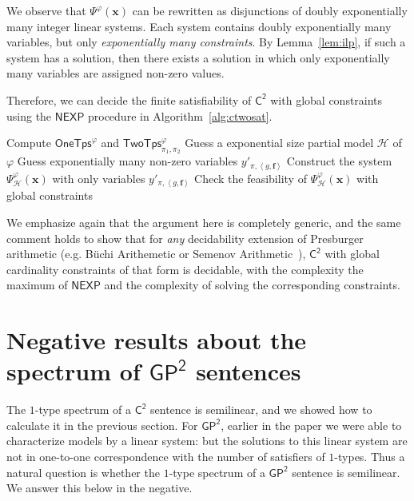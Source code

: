 \documentclass[10pt,a4paper]{article}
\theoremstyle{definition}
\theoremstyle{remark}
\newcommand{\cH}{\mathcal{H}}
\newcommand{\bff}{\mathbf{f}}
\newcommand{\bfx}{\mathbf{x}}
\newcommand{\nexp}  {\mathsf{NEXP}}
\newcommand{\nexptime}  {\mathsf{NEXP}}
\newcommand{\Ctwo}    {\mathsf{C^2}}
\newcommand{\twotypes}{\mathsf{TwoTps}}
\newcommand{\Onetypes}{\mathsf{OneTps}}
\newcommand{\GPtwo}   {\mathsf{GP^2}}
\newcommand{\tuple}[1]       {\left\langle #1 \right\rangle}
\begin{document}
We observe that $\Psi^\varphi(\bfx)$ can be rewritten as disjunctions of doubly exponentially many integer linear systems.
Each system contains doubly exponentially many variables, but only \emph{exponentially many constraints}.
By Lemma~\ref{lem:ilp}, if such a system has a solution,
then there exists a solution in which only exponentially many variables are assigned non-zero values.

Therefore, we can decide the finite satisfiability of $\Ctwo$ with global constraints 
using the $\nexp$ procedure in Algorithm~\ref{alg:ctwosat}.

\begin{algorithm}
\begin{algorithmic}[1]
\caption{Algorithm for the finite satisfiability problem of $\Ctwo$ with global constraints}\label{alg:ctwosat}
    \State Compute $\Onetypes^\varphi$ and $\twotypes^\varphi_{\pi_1, \pi_2}$
        \State Guess a exponential size partial model $\cH$ of $\varphi$
    \State Guess exponentially many non-zero variables $y'_{\pi, \tuple{g, \bff}}$
    \State Construct the system $\Psi^\varphi_{\cH}(\bfx)$ with only variables $y'_{\pi, \tuple{g, \bff}}$
    \State Check the feasibility of $\Psi^\varphi_{\cH}(\bfx)$ with global constraints
\EndProcedure
\end{algorithmic}
\end{algorithm}

We emphasize again that the argument here is completely generic, and the same comment holds to show that for \emph{any} decidability extension of Presburger arithmetic (e.g. B\"uchi Arithemetic or Semenov Arithmetic~\cite{semenovpresexp}), $\Ctwo$ with global cardinality constraints of that form is decidable, with the complexity the maximum of $\nexptime$ and the complexity of solving the corresponding constraints.



\section{Negative results about the spectrum of $\GPtwo$ sentences} \label{sec:gptwocounter}
The $1$-type spectrum of a $\Ctwo$ sentence is semilinear, and we showed how to calculate it in
the previous section. For $\GPtwo$, earlier in the paper we were able to characterize models by a linear system: but the solutions
to this linear system are not in one-to-one correspondence with the number of satisfiers of $1$-types.
Thus a natural question is whether the $1$-type spectrum of a $\GPtwo$ sentence is semilinear. We answer this below in
the negative.
\end{document}
